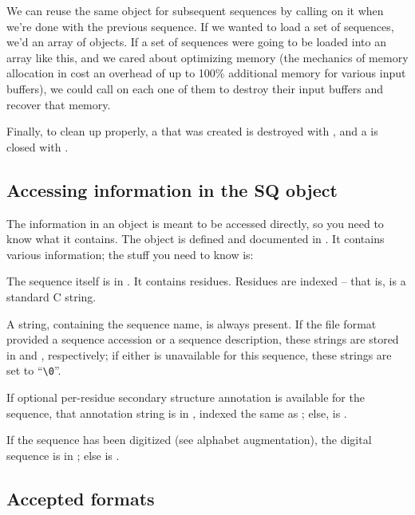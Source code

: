 We can reuse the same  object for subsequent sequences
by calling  on it when we're done with the
previous sequence. If we wanted to load a set of sequences, we'd
 an array of  objects. If a set of
sequences were going to be loaded into an array like this, and we
cared about optimizing memory (the mechanics of memory allocation in
 cost an overhead of up to 100\% additional
memory for various input buffers), we could call
 on each one of them to destroy their input
buffers and recover that memory.

Finally, to clean up properly, a  that was created is
destroyed with , and a 
is closed with .

\subsection{Accessing information in the SQ object}

The information in an  object is meant to be accessed
directly, so you need to know what it contains. The object is defined
and documented in . It contains various information;
the stuff you need to know is:



The sequence itself is in . It contains 
residues. Residues are indexed  -- that is, 
is a standard C string. 

A  string, containing the sequence name, is always
present. If the file format provided a sequence accession or a
sequence description, these strings are stored in  and
, respectively; if either is unavailable for this
sequence, these strings are set to ``\verb+\0+''.

If optional per-residue secondary structure annotation is available
for the sequence, that annotation string is in , indexed the
same as ; else,  is .

If the sequence has been digitized (see alphabet augmentation), the
 digital sequence is in ; else  is
.

\subsection{Accepted formats}

